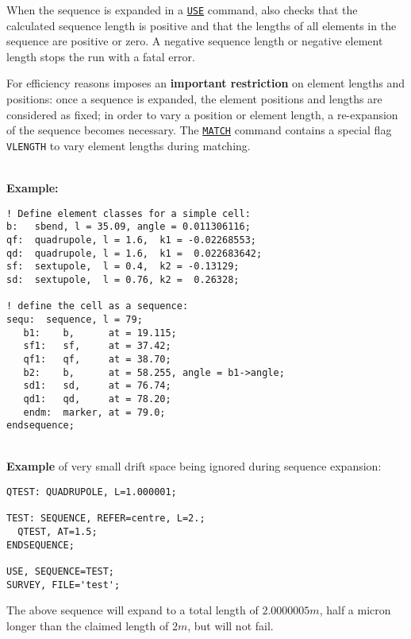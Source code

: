 When the sequence is expanded in a \hyperref[sec:use]{\texttt{USE}} 
command, \madx also checks that the calculated sequence length 
is positive and that the lengths of all elements in the sequence 
are positive or zero. A negative sequence length or negative element 
length stops the \madx run with a fatal error.

For efficiency reasons \madx imposes an \textbf{important restriction}
on element lengths and positions: once a sequence is expanded, the
element positions and lengths are considered as fixed; in order to vary
a position or element length, a re-expansion of the sequence becomes
necessary. The \hyperref[chap:match]{\texttt{MATCH}} command contains a
special flag \texttt{VLENGTH} to vary element lengths during matching.

\madhline \\
\textbf{Example:}
\begin{verbatim}
! Define element classes for a simple cell:
b:   sbend, l = 35.09, angle = 0.011306116;
qf:  quadrupole, l = 1.6,  k1 = -0.02268553;
qd:  quadrupole, l = 1.6,  k1 =  0.022683642;
sf:  sextupole,  l = 0.4,  k2 = -0.13129;
sd:  sextupole,  l = 0.76, k2 =  0.26328;

! define the cell as a sequence:
sequ:  sequence, l = 79;
   b1:    b,      at = 19.115;
   sf1:   sf,     at = 37.42;
   qf1:   qf,     at = 38.70;
   b2:    b,      at = 58.255, angle = b1->angle;
   sd1:   sd,     at = 76.74;
   qd1:   qd,     at = 78.20;
   endm:  marker, at = 79.0;
endsequence;
\end{verbatim}
\madhline

\vskip 5mm
\madhline \\
\textbf{Example} of very small drift space being ignored during sequence
expansion: 
\begin{verbatim}
QTEST: QUADRUPOLE, L=1.000001;

TEST: SEQUENCE, REFER=centre, L=2.;
  QTEST, AT=1.5;
ENDSEQUENCE;

USE, SEQUENCE=TEST;
SURVEY, FILE='test';
\end{verbatim}
The above sequence will expand to a total length of $2.0000005 m$, half
a micron longer than the claimed length of $2 m$, but will not fail.\\
\madhline

